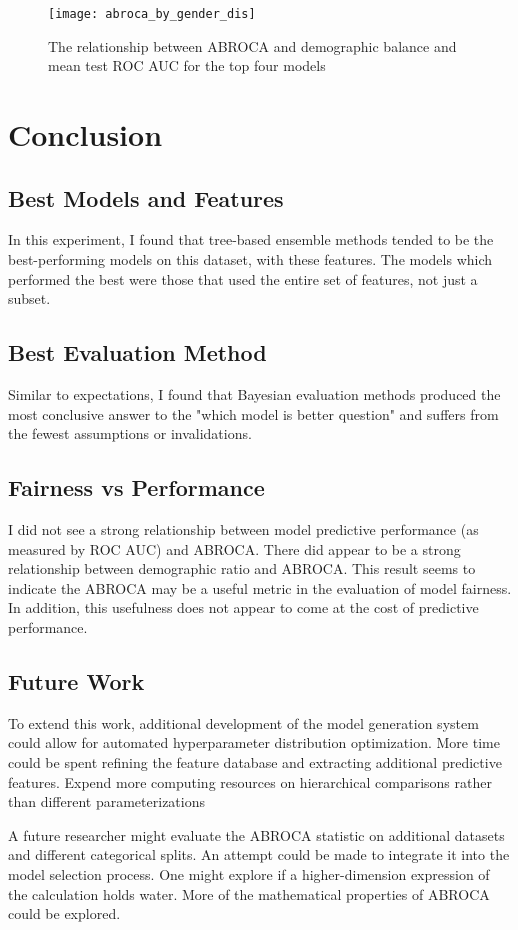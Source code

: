 \documentclass{article}
\begin{document}
        \begin{figure}
            \centering
            \texttt{[image: abroca\_by\_gender\_dis]}
            \caption{The relationship between ABROCA and demographic balance and mean test ROC AUC for the top four models}
            \label{fig:abroca_by_gender_dis}
        \end{figure}

\section{Conclusion}

    \subsection{Best Models and Features}
        In this experiment, I found that tree-based ensemble methods tended to be the best-performing models on this dataset, with these features.
        The models which performed the best were those that used the entire set of features, not just a subset.
        
    \subsection{Best Evaluation Method}
        Similar to expectations, I found that Bayesian evaluation methods produced the most conclusive answer to the "which model is better question" and suffers from the fewest assumptions or invalidations.

        
    \subsection{Fairness vs Performance}
        I did not see a strong relationship between model predictive performance (as measured by ROC AUC) and ABROCA.
        There did appear to be a strong relationship between demographic ratio and ABROCA.
        This result seems to indicate the ABROCA may be a useful metric in the evaluation of model fairness.
        In addition, this usefulness does not appear to come at the cost of predictive performance.

    \subsection{Future Work}
        To extend this work, additional development of the model generation system could allow for automated hyperparameter distribution optimization.
        More time could be spent refining the feature database and extracting additional predictive features.
        Expend more computing resources on hierarchical comparisons rather than different parameterizations 
        
        A future researcher might evaluate the ABROCA statistic on additional datasets and different categorical splits.
        An attempt could be made to integrate it into the model selection process.
        One might explore if a higher-dimension expression of the calculation holds water.
        More of the mathematical properties of ABROCA could be explored.



        
        
    
\end{document}

